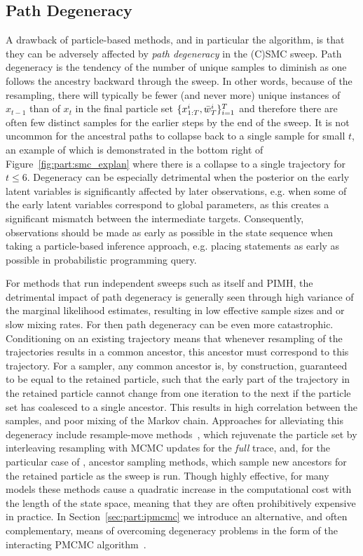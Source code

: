 \subsection{Path Degeneracy}
\label{sec:part:pmcmc:path-deg}

A drawback of particle-based methods, and in particular the \pg algorithm, is that they can be adversely 
affected by \emph{path degeneracy} in the (C)SMC sweep.  Path degeneracy is the tendency of the number
of unique samples to diminish as one follows the ancestry backward through the sweep.  In other words, because
of the resampling, there will typically be fewer (and never more) unique instances of $x_{t-1}$ than of $x_t$
in the final particle set $\{x_{1:T}^i,\bar w_{T}^i\}_{i=1}^T$ and therefore there are often few distinct samples
for the earlier steps by the end of the sweep.  It is not uncommon for the ancestral paths to collapse back to a single sample for
small $t$, an example of which is demonstrated in the bottom right of Figure~\ref{fig:part:smc_explan}
where there is a collapse to a single trajectory for $t\le6$.
Degeneracy can be especially detrimental when the posterior on the early latent variables is significantly
affected by later observations, e.g. when some of the early latent variables correspond to global parameters,
as this creates a significant mismatch between the intermediate targets.  Consequently, observations should
be made as early as possible in the state sequence when taking a particle-based inference approach, e.g.
placing \observe statements as early as possible in probabilistic programming query.

For methods that run independent \smc sweeps such as \smc itself and PIMH, the detrimental impact
of path degeneracy is generally seen through high variance of the marginal likelihood estimates,  resulting
in  low effective sample sizes and or slow mixing rates.  For \pg then path degeneracy can be even
more catastrophic.  Conditioning on an existing trajectory means 
that whenever resampling of the trajectories results in a common ancestor, this ancestor must correspond 
to this trajectory.  For a \pg sampler, any common ancestor is, by construction, guaranteed to be equal 
to the retained particle, such that the early part of the trajectory in the retained particle cannot
change from one iteration to the next if the particle set has coalesced to a single ancestor.
This results in high correlation between the samples, and poor mixing of the Markov chain.
Approaches for alleviating this degeneracy include resample-move methods~\citep{chopin2013smc2},
which rejuvenate the particle set by interleaving resampling with MCMC updates for the \emph{full} trace,
and, for the particular case of \pg, ancestor sampling \citep{lindstenJS2014} methods, 
which sample new ancestors for the retained particle as the 
\csmc sweep is run.  Though highly effective, for many models these methods cause a quadratic increase
in the computational cost with the length of the state space, meaning that they are often prohibitively expensive
in practice.  In Section~\ref{sec:part:ipmcmc} we introduce an alternative, and often complementary, 
means of overcoming degeneracy
problems in the form of the interacting PMCMC algorithm~\citep{rainforth2016interacting}.


